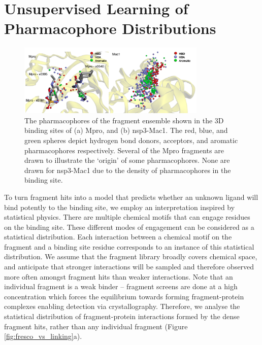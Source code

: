 \section{Unsupervised Learning of Pharmacophore Distributions} \label{sec:model}

\begin{figure}[th]
    \centering
    \includegraphics[width=0.8\textwidth]{Chapters/Fresco/Figs/pharmacophores.png}
    \caption{The pharmacophores of the fragment ensemble shown in the 3D binding sites of (a) Mpro, and (b) nsp3-Mac1. The red, blue, and green spheres depict hydrogen bond donors, acceptors, and aromatic pharmacophores respectively. Several of the Mpro fragments are drawn to illustrate the ‘origin’ of some pharmacophores. None are drawn for nsp3-Mac1 due to the density of pharmacophores in the binding site.}
    \label{fig:pharmacophores}
\end{figure}


To turn fragment hits into a model that predicts whether an unknown ligand will bind potently to the binding site, we employ an interpretation inspired by statistical physics. There are multiple chemical motifs that can engage residues on the binding site. These different modes of engagement can be considered as a statistical distribution. Each interaction between a chemical motif on the fragment and a binding site residue corresponds to an instance of this statistical distribution. We assume that the fragment library broadly covers chemical space, and anticipate that stronger interactions will be sampled and therefore observed more often amongst fragment hits than weaker interactions. Note that an individual fragment is a weak binder -- fragment screens are done at a high concentration which forces the equilibrium towards forming fragment-protein complexes enabling detection via crystallography. Therefore, we analyse the statistical distribution of fragment-protein interactions formed by the dense fragment hits, rather than any individual fragment (Figure \ref{fig:fresco_vs_linking}a).

